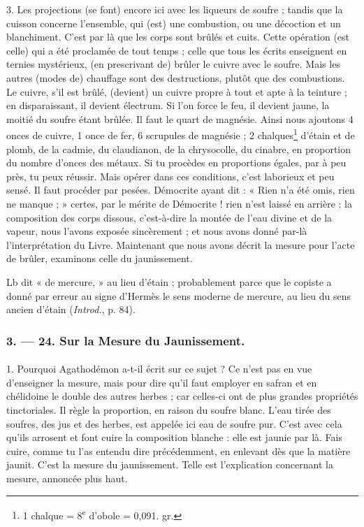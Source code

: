 \documentclass[landscape, a4paper, 11pt, oneside, polutonikogreek, french]{article}
\begin{document}
3. Les projections (se font) encore ici avec les liqueurs de soufre ; tandis que la cuisson concerne l'ensemble, qui (est) une combustion, ou une décoction et un blanchiment. C'est par là que les corps sont brûlés et cuits. Cette opération (est celle) qui a été proclamée de tout temps ; celle que tous les écrits enseignent en ternies mystérieux, (en prescrivant de) brûler le cuivre avec le soufre. Mais les autres (modes de) chauffage sont des destructions, plutôt que des combustions. Le cuivre, s'il est brûlé, (devient) un cuivre propre à tout et apte à la teinture ; en disparaissant, il devient électrum. Si l'on force le feu, il devient jaune, la moitié du soufre étant brûlée. Il faut le quart de magnésie. Ainsi nous ajoutons 4 onces de cuivre, 1 once de fer, 6 scrupules de magnésie ; 2 chalques\footnote{1 chalque = 8\textsuperscript{e} d'obole = 0,091. gr.  } d'étain et de plomb, de la cadmie, du claudianon, de la chrysocolle, du cinabre, en proportion du nombre d'onces des métaux. Si tu procèdes en proportions égales, par à peu près, tu peux réussir. Mais opérer dans ces conditions, c'est laborieux et peu sensé. Il faut procéder par pesées. Démocrite ayant dit : « Rien n'a été omis, rien ne manque ; » certes, par le mérite de Démocrite ! rien n'est laissé en arrière : la composition des corps dissous, c'est-à-dire la montée de l'eau divine et de la vapeur, nous l'avons exposée sincèrement ; et nous avons donné par-là l'interprétation du Livre. Maintenant que nous avons décrit la mesure pour l'acte de brûler, examinons celle du jaunissement.

Lb dit « de mercure, » au lieu d'étain ; probablement parce que le copiste a donné par erreur au signe d'Hermès le sens moderne de mercure, au lieu du sens ancien d'étain (\emph{Introd.}, p. 84).

\bigskip
\centerline{\EightStarTaper}
\centerline{\EightStarTaper\EightStarTaper}
\bigskip

\subsubsection{3. --- 24. Sur la Mesure du Jaunissement.}
\paragraph{}
1. Pourquoi Agathodémon a-t-il écrit sur ce sujet ? Ce n'est pas en vue d'enseigner la mesure, mais pour dire qu'il faut employer en safran et en chélidoine le double des autres herbes ; car celles-ci ont de plus grandes propriétés tinctoriales. Il règle la proportion, en raison du soufre blanc. L'eau tirée des soufres, des jus et des herbes, est appelée ici eau de soufre pur. C'est avec cela qu'ils arrosent et font cuire la composition blanche : elle est jaunie par là. Fais cuire, comme tu l'as entendu dire précédemment, en enlevant dès que la matière jaunit. C'est la mesure du jaunissement. Telle est l'explication concernant la mesure, annoncée plus haut.
\end{document}
